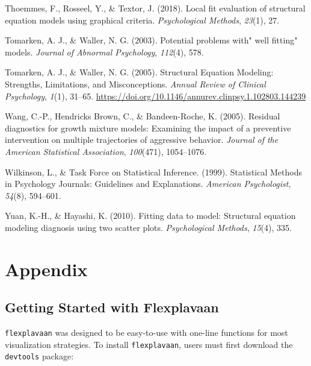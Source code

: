 \documentclass[
  english,
  man]{apa6}
\newlength{\cslhangindent}
\newenvironment{cslreferences}%
  {\setlength{\parindent}{0pt}%
  \everypar{\setlength{\hangindent}{\cslhangindent}}\ignorespaces}%
  {\par}
\begin{document}
\begin{cslreferences}
\leavevmode\hypertarget{ref-thoemmes2018local}{}%
Thoemmes, F., Rosseel, Y., \& Textor, J. (2018). Local fit evaluation of structural equation models using graphical criteria. \emph{Psychological Methods}, \emph{23}(1), 27.

\leavevmode\hypertarget{ref-tomarken2003potential}{}%
Tomarken, A. J., \& Waller, N. G. (2003). Potential problems with" well fitting" models. \emph{Journal of Abnormal Psychology}, \emph{112}(4), 578.

\leavevmode\hypertarget{ref-Tomarken2005}{}%
Tomarken, A. J., \& Waller, N. G. (2005). Structural Equation Modeling: Strengths, Limitations, and Misconceptions. \emph{Annual Review of Clinical Psychology}, \emph{1}(1), 31--65. \url{https://doi.org/10.1146/annurev.clinpsy.1.102803.144239}

\leavevmode\hypertarget{ref-wang2005residual}{}%
Wang, C.-P., Hendricks Brown, C., \& Bandeen-Roche, K. (2005). Residual diagnostics for growth mixture models: Examining the impact of a preventive intervention on multiple trajectories of aggressive behavior. \emph{Journal of the American Statistical Association}, \emph{100}(471), 1054--1076.

\leavevmode\hypertarget{ref-Wilkinson1999a}{}%
Wilkinson, L., \& Task Force on Statistical Inference. (1999). Statistical Methods in Psychology Journals: Guidelines and Explanations. \emph{American Psychologist}, \emph{54}(8), 594--601.

\leavevmode\hypertarget{ref-yuan2010fitting}{}%
Yuan, K.-H., \& Hayashi, K. (2010). Fitting data to model: Structural equation modeling diagnosis using two scatter plots. \emph{Psychological Methods}, \emph{15}(4), 335.
\end{cslreferences}

\pagebreak

\hypertarget{appendix}{%
\section{Appendix}\label{appendix}}

\hypertarget{getting-started-with-flexplavaan}{%
\subsection{Getting Started with Flexplavaan}\label{getting-started-with-flexplavaan}}

\texttt{flexplavaan} was designed to be easy-to-use with one-line functions for most visualization strategies. To install \texttt{flexplavaan}, users must first download the \texttt{devtools} package:
\end{document}
